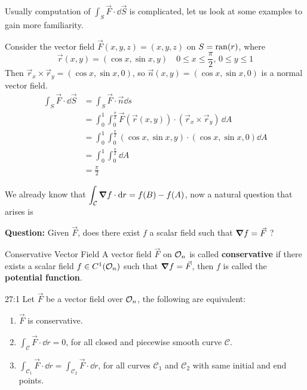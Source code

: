 \documentclass[../Analysis-3.tex]{subfiles}
\begin{document}
Usually computation of $\displaystyle\int_S \vec{F} \cdot \dd \vec{S}$ is complicated, let us look at some examples to gain more familiarity.

\begin{Eg}{}{}
  Consider the vector field $\vec{F}(x,y,z) = (x,y,z)$ on $S = \operatorname{ran}(r)$, where
  \[
    \vec{r}(x,y) = (\cos x, \sin x, y) \quad 0 \leq x \leq \frac{\pi}{2}, \, 0 \leq y \leq 1
  \]
  Then $\vec{r}_x \times \vec{r}_y = (\cos x, \sin x, 0)$, so $\vec{n}(x,y) = (\cos x, \sin x, 0)$ is a normal vector field.
  \begin{align*}
    \int_S \vec{F} \cdot \dd \vec{S}
     & = \int_S \vec{F} \cdot \vec{n} \dd s                                                                \\
     & = \int_0^1 \int_0^{\frac{\pi}{2}} \vec{F}(\vec{r}(x,y)) \cdot (\vec{r}_x \times \vec{r}_y) \, \dd A \\
     & = \int_0^1 \int_0^{\frac{\pi}{2}}  (\cos x, \sin x, y) \cdot (\cos x, \sin x, 0) \dd A              \\
     & = \int_0^1 \int_{0}^{\frac{\pi}{2}} \dd A                                                           \\
     & = \frac{\pi}{2}
  \end{align*}
\end{Eg}

We already know that $\displaystyle\int_{\mathcal{C}} \grad f \cdot \dd r = f(B) - f(A)$, now a natural question that arises is

\textbf{Question:} Given $\vec{F}$, does there exist $f$ a scalar field such that $\grad f = \vec{F}$ ?

\begin{Def}{Conservative Vector Field}{}
  A vector field $\vec{F}$ on $\mathcal{O}_{n}$ is called \textbf{conservative} if there exists a scalar field $f \in C^1(\mathcal{O}_{n})$ such that $\grad f = \vec{F}$, then $f$ is called the \textbf{potential function}.
\end{Def}

\begin{Thm}{}{27:1}
  Let $\vec{F}$ be a vector field over $\mathcal{O}_{n}$, the following are equivalent:
  \begin{enumerate}
    \item $\vec{F}$ is conservative.
    \item $\displaystyle\int_{\mathcal{C}}\vec{F} \cdot \dd r = 0$, for all closed and piecewise smooth curve $\mathcal{C}$.
    \item $\displaystyle\int_{\mathcal{C}_1} \vec{F} \cdot \dd r = \int_{\mathcal{C}_2} \vec{F} \cdot \dd r$, for all curves $\mathcal{C}_1$ and $\mathcal{C}_2$ with same initial and end points.
  \end{enumerate}
\end{Thm}
\end{document}
